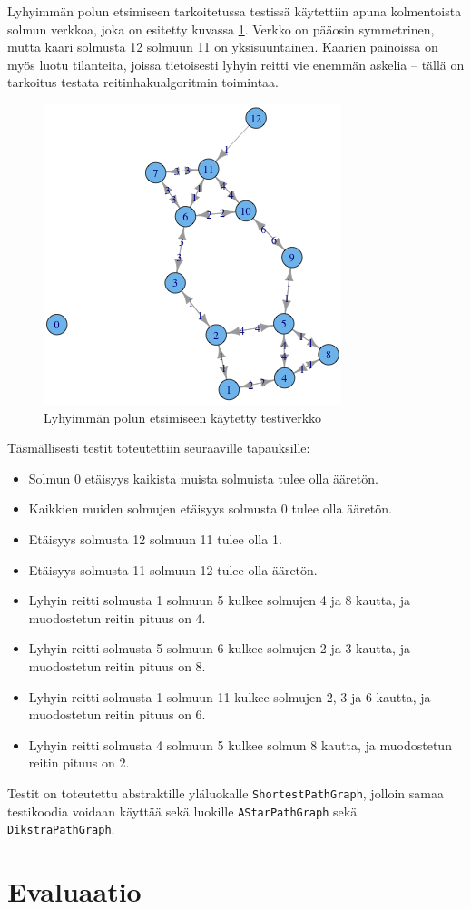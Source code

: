 \documentclass[10pt,a4paper]{article}
\begin{document}
Lyhyimmän polun etsimiseen tarkoitetussa testissä käytettiin apuna kolmentoista solmun verkkoa, joka on esitetty kuvassa \ref{testiverkko}. Verkko on pääosin symmetrinen, mutta kaari solmusta 12 solmuun 11 on yksisuuntainen. Kaarien painoissa on myös luotu tilanteita, joissa tietoisesti lyhyin reitti vie enemmän askelia -- tällä on tarkoitus testata reitinhakualgoritmin toimintaa.

\begin{figure}
\includegraphics[scale=.5]{test_network.png} 
\caption{Lyhyimmän polun etsimiseen käytetty testiverkko}
\label{testiverkko}
\end{figure}

Täsmällisesti testit toteutettiin seuraaville tapauksille:

\begin{itemize}
\item Solmun 0 etäisyys kaikista muista solmuista tulee olla ääretön.
\item Kaikkien muiden solmujen etäisyys solmusta 0 tulee olla ääretön.
\item Etäisyys solmusta 12 solmuun 11 tulee olla 1.
\item Etäisyys solmusta 11 solmuun 12 tulee olla ääretön.
\item Lyhyin reitti solmusta 1 solmuun 5 kulkee solmujen 4 ja 8 kautta, ja muodostetun reitin pituus on 4.
\item Lyhyin reitti solmusta 5 solmuun 6 kulkee solmujen 2 ja 3 kautta, ja muodostetun reitin pituus on 8.
\item Lyhyin reitti solmusta 1 solmuun 11 kulkee solmujen 2, 3 ja 6 kautta, ja muodostetun reitin pituus on 6.
\item Lyhyin reitti solmusta 4 solmuun 5 kulkee solmun 8 kautta, ja muodostetun reitin pituus on 2.
\end{itemize}

Testit on toteutettu abstraktille yläluokalle \texttt{ShortestPathGraph}, jolloin samaa testikoodia voidaan käyttää sekä luokille \texttt{AStarPathGraph} sekä \texttt{DikstraPathGraph}.

\section{Evaluaatio}

 

\end{document}
